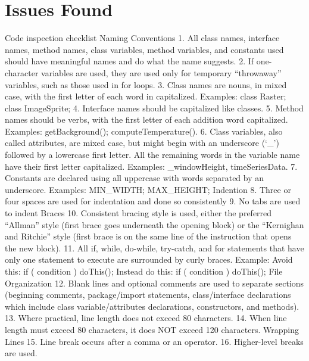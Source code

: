 \section{Issues Found}

Code	inspection	checklist
Naming	Conventions
1. All	class	names,	interface	names,	method	names,	class	variables,	method	
variables,	and	constants	used	should	have	meaningful	names	and	do	what	
the	name	suggests.
2. If	 one-character	 variables	 are	 used,	 they	 are	 used	 only	 for	 temporary	
“throwaway”	variables,	such	as	those	used	in	for	loops.
3. Class	names	are	nouns,	in	mixed	case,	with	the	first	letter	of	each	word	in	
capitalized.	Examples:		class	Raster;		class	ImageSprite;	
4. Interface	names	should	be	capitalized	like	classes.
5. Method	names	should	be	verbs,	with	the	first	letter	of	each	addition	word	
capitalized.	Examples:		getBackground();		computeTemperature().
6. Class	 variables,	 also	 called	 attributes,	 are	 mixed	 case,	 but	 might	 begin	
with	 an	 underscore	 (‘\_’)	 followed	 by	 a	 lowercase	 first letter.	 	 All	 the	
remaining	words	in	 the	 variable	 name have	 their	 first	letter capitalized.		
Examples:			\_windowHeight,		timeSeriesData.
7. Constants	 are	 declared	 using	 all	 uppercase	 with	 words	 separated	 by	 an	
underscore.		Examples:			MIN\_WIDTH;		MAX\_HEIGHT;
Indention
8. Three	or	four	spaces	are	used	for	indentation	and	done	so	consistently
9. No	tabs	are	used	to	indent
Braces
10. Consistent	bracing	style	is	used,	either	the	preferred	“Allman”	style	(first	
brace	goes	underneath	the	opening	block)	or	the	“Kernighan	and	Ritchie”	
style (first	brace	is	on	the	same	line	of	the	instruction	that	opens	the	new	
block).
11. All	 if,	 while,	 do-while,	 try-catch,	 and	 for	 statements	 that	 have	 only	 one	
statement	to	execute	are	surrounded	by	curly	braces.		Example:
Avoid	this:
if (	condition	)
doThis();
Instead	do	this:
if	(	condition	)	
{
	doThis();
}
File	Organization
12. Blank	 lines	 and	 optional	 comments	 are	 used	 to	 separate	 sections	
(beginning	 comments,	 package/import	 statements,	 class/interface	
declarations	 which	 include	 class	 variable/attributes	 declarations,	
constructors,	and	methods).
13. Where	practical,	line	length	does	not	exceed	80	characters.
14. When	 line	 length	 must	 exceed	 80	 characters,	 it	 does	 NOT	 exceed	 120	
characters.	
Wrapping	Lines
15. Line	break	occurs	after	a	comma	or	an	operator.
16. Higher-level	breaks	are	used.
